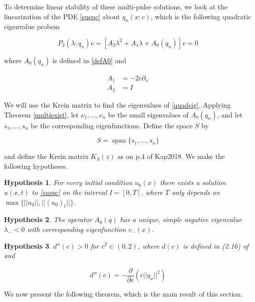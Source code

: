 \documentclass[12pt]{article}
\DeclareMathOperator{\spn}{span}
\newtheorem{hypothesis}{Hypothesis}
\begin{document}
To determine linear stability of these multi-pulse solutions, we look at the linearization of the PDE \eqref{suspc} about $q_n(x; c)$, which is the following quadratic eigenvalue probem

\begin{equation}\label{quadeig}
P_2(\lambda; q_n)v =  [A_2 \lambda^2 + A_1 \lambda + A_0(q_n)]v = 0
\end{equation}

where $A_0(q_n)$ is defined in \eqref{defA0} and 

\begin{align}
A_1 &= -2 c \partial_x \\
A_2 &= I
\end{align}

We will use the Krein matrix to find the eigenvalues of \eqref{quadeig}. Applying Theorem \ref{multiexist}, let $\nu_1, \dots, \nu_n$ be the small eigenvalues of $A_0(q_n)$, and let $s_1, \dots, s_n$ be the corresponding eigenfunctions. Define the space $S$ by

\begin{equation}\label{defS}
S = \spn\{s_1, \dots, s_n \}
\end{equation}

and define the Krein matrix $K_S(z)$ as on p.4 of Kap2018. We make the following hypotheses.

\begin{hypothesis}\label{PDEexisthyp}
For every initial condition $u_0(x)$ there exists a solution $u(x, t)$ to \eqref{suspc} on the interval $I = [0, T]$, where $T$ only depends on $\max{ \{ ||u_0||, ||(u_0)_t|| \} }$.
\end{hypothesis}

\begin{hypothesis}\label{A0neg}
The operator $A_0(q)$ has a unique, simple negative eigenvalue $\lambda_- < 0$ with corresponding eigenfunction $v_-(x)$.
\end{hypothesis}

\begin{hypothesis}\label{dccpos}
$d''(c) > 0$ for $c^2 \in (0, 2)$, where $d(c)$ is defined in (2.16) of \cite{Grillakis1987} and 

\begin{equation}\label{dcc}
d''(c) = -\frac{\partial}{\partial c} \left( c ||q_x||^2 \right)
\end{equation}
\end{hypothesis}

We now present the following theorem, which is the main result of this section.
\end{document}
